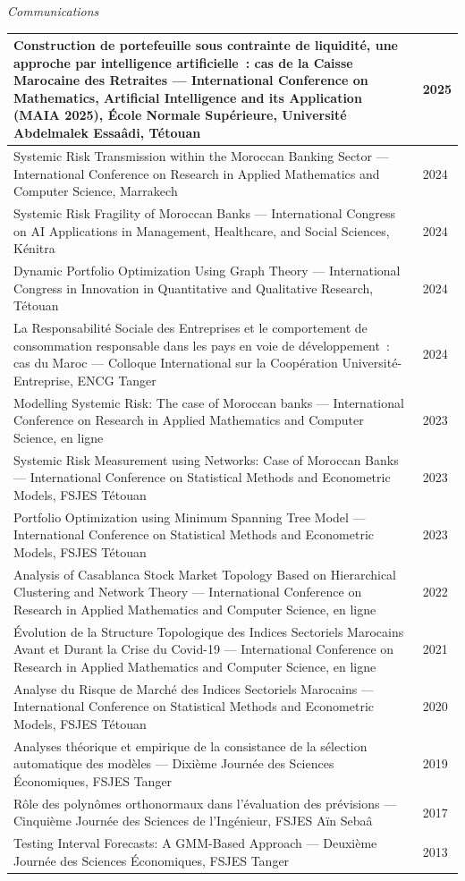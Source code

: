 \documentclass[10.5pt,a4paper]{article}
\makeatletter
\newcommand{\cvsubsection}[1]{%
  \vspace{9pt}%
  {\itshape\fontsize{12.5}{14}\selectfont\color{inksoft}#1}\par
  \vspace{5pt}
}
\newenvironment{cvlist}{%
  \renewcommand{\arraystretch}{1.486}%
  \begin{longtable}{@{}L{\dimexpr\textwidth-2.9cm-4mm\relax}@{\hspace{4mm}}R{2.9cm}@{}}
}{%
  \end{longtable}
}
\newcommand{\cvrow}[2]{%
  \fontsize{9.7}{13}\selectfont\color{textmain} #1 & {\sffamily\fontsize{8.3}{11}\selectfont\color{textsoft} #2}\\
  \hline
}
\newcommand{\cvrowlast}[2]{%
  \fontsize{9.7}{13}\selectfont\color{textmain} #1 & {\sffamily\fontsize{8.3}{11}\selectfont\color{textsoft} #2}\\
}
\makeatother
\begin{document}
\cvsubsection{Communications}
\begin{cvlist}
\cvrow{Construction de portefeuille sous contrainte de liquidité, une approche par intelligence artificielle~: cas de la Caisse Marocaine des Retraites --- International Conference on Mathematics, Artificial Intelligence and its Application (MAIA 2025), École Normale Supérieure, Université Abdelmalek Essaâdi, Tétouan}{2025}
\cvrow{Systemic Risk Transmission within the Moroccan Banking Sector --- International Conference on Research in Applied Mathematics and Computer Science, Marrakech}{2024}
\cvrow{Systemic Risk Fragility of Moroccan Banks --- International Congress on AI Applications in Management, Healthcare, and Social Sciences, Kénitra}{2024}
\cvrow{Dynamic Portfolio Optimization Using Graph Theory --- International Congress in Innovation in Quantitative and Qualitative Research, Tétouan}{2024}
\cvrow{La Responsabilité Sociale des Entreprises et le comportement de consommation responsable dans les pays en voie de développement~: cas du Maroc --- Colloque International sur la Coopération Université-Entreprise, ENCG Tanger}{2024}
\cvrow{Modelling Systemic Risk: The case of Moroccan banks --- International Conference on Research in Applied Mathematics and Computer Science, en ligne}{2023}
\cvrow{Systemic Risk Measurement using Networks: Case of Moroccan Banks --- International Conference on Statistical Methods and Econometric Models, FSJES Tétouan}{2023}
\cvrow{Portfolio Optimization using Minimum Spanning Tree Model --- International Conference on Statistical Methods and Econometric Models, FSJES Tétouan}{2023}
\cvrow{Analysis of Casablanca Stock Market Topology Based on Hierarchical Clustering and Network Theory --- International Conference on Research in Applied Mathematics and Computer Science, en ligne}{2022}
\cvrow{Évolution de la Structure Topologique des Indices Sectoriels Marocains Avant et Durant la Crise du Covid-19 --- International Conference on Research in Applied Mathematics and Computer Science, en ligne}{2021}
\cvrow{Analyse du Risque de Marché des Indices Sectoriels Marocains --- International Conference on Statistical Methods and Econometric Models, FSJES Tétouan}{2020}
\cvrow{Analyses théorique et empirique de la consistance de la sélection automatique des modèles --- Dixième Journée des Sciences Économiques, FSJES Tanger}{2019}
\cvrow{Rôle des polynômes orthonormaux dans l'évaluation des prévisions --- Cinquième Journée des Sciences de l'Ingénieur, FSJES Aïn Sebaâ}{2017}
\cvrowlast{Testing Interval Forecasts: A GMM-Based Approach --- Deuxième Journée des Sciences Économiques, FSJES Tanger}{2013}
\end{cvlist}
\end{document}
